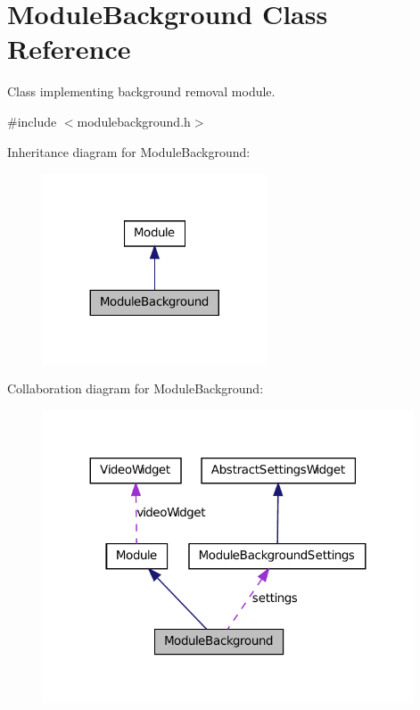 \hypertarget{class_module_background}{
\section{ModuleBackground Class Reference}
\label{d0/deb/class_module_background}
}


Class implementing background removal module.  




{\ttfamily \#include $<$modulebackground.h$>$}



Inheritance diagram for ModuleBackground:
\nopagebreak
\begin{figure}[H]
\begin{center}
\leavevmode
\includegraphics[width=188pt]{d3/dfe/class_module_background__inherit__graph}
\end{center}
\end{figure}


Collaboration diagram for ModuleBackground:
\nopagebreak
\begin{figure}[H]
\begin{center}
\leavevmode
\includegraphics[width=311pt]{de/dbe/class_module_background__coll__graph}
\end{center}
\end{figure}
